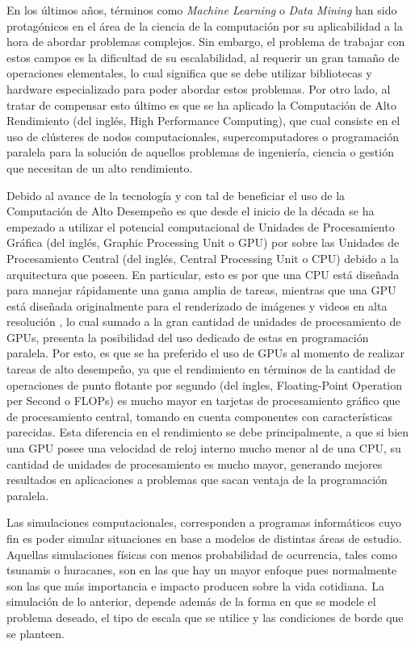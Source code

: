 
En los últimos años, términos como \textit{Machine Learning} o \textit{Data Mining} han sido protagónicos en el área de la ciencia de la computación por su aplicabilidad a la hora de abordar problemas complejos.
Sin embargo, el problema de trabajar con estos campos es la dificultad de su escalabilidad, al requerir un gran tamaño de operaciones elementales, lo cual significa que se debe utilizar bibliotecas y hardware especializado para poder abordar estos problemas.
Por otro lado, al tratar de compensar esto último es que se ha aplicado la Computación de Alto Rendimiento (del inglés, High Performance Computing), que cual consiste en el uso de clústeres de nodos computacionales, supercomputadores o programación paralela para la solución de aquellos problemas de ingeniería, ciencia o gestión que necesitan de un alto rendimiento.

Debido al avance de la tecnología y con tal de beneficiar el uso de la Computación de Alto Desempeño es que desde el inicio de la década se ha empezado a utilizar el potencial computacional de Unidades de Procesamiento Gráfica (del inglés, Graphic Processing Unit o GPU) por sobre las Unidades de Procesamiento Central (del inglés, Central Processing Unit o CPU) debido a la arquitectura que poseen. 
En particular, esto es por que una CPU está diseñada para manejar rápidamente una gama amplia de tareas, mientras que una GPU está diseñada originalmente para el renderizado de imágenes y videos en alta resolución \cite{gpu}, lo cual sumado a la gran cantidad de unidades de procesamiento de GPUs, presenta la posibilidad del uso dedicado de estas en programación paralela.
Por esto, es que se ha preferido el uso de GPUs al momento de realizar tareas de alto desempeño, ya que el rendimiento en términos de la cantidad de operaciones de punto flotante por segundo (del ingles, Floating-Point Operation per Second o FLOPs) es mucho mayor en tarjetas de procesamiento gráfico que de procesamiento central, tomando en cuenta componentes con características parecidas.
Esta diferencia en el rendimiento se debe principalmente, a que si bien una GPU posee una velocidad de reloj interno mucho menor al de una CPU, su cantidad de unidades de procesamiento es mucho mayor, generando mejores resultados en aplicaciones a problemas que sacan ventaja de la programación paralela.

Las simulaciones computacionales, corresponden a programas informáticos cuyo fin es poder simular situaciones en base a modelos de distintas áreas de estudio.
Aquellas simulaciones físicas con menos probabilidad de ocurrencia, tales como tsunamis o huracanes, son en las que hay un mayor enfoque pues normalmente son las que más importancia e impacto producen sobre la vida cotidiana.
La simulación de lo anterior, depende además de la forma en que se modele el problema deseado, el tipo de escala que se utilice y las condiciones de borde que se planteen.

